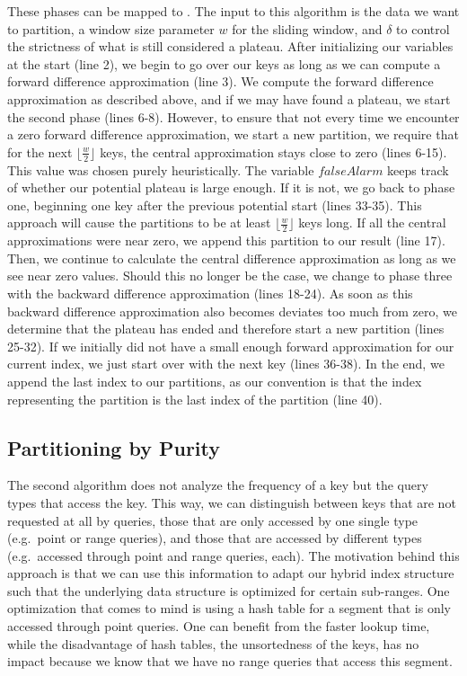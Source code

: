 These phases can be mapped to . The input to this algorithm is the data we want to partition, a window size parameter $w$ for the sliding window, and $\delta$ to control the strictness of what is still considered a plateau. After initializing our variables at the start (line 2), we begin to go over our keys as long as we can compute a forward difference approximation (line 3). We compute the forward difference approximation as described above, and if we may have found a plateau, we start the second phase (lines 6-8). However, to ensure that not every time we encounter a zero forward difference approximation, we start a new partition, we require that for the next $\lfloor \frac{w}{2} \rfloor$ keys, the central approximation stays close to zero (lines 6-15). This value was chosen purely heuristically. The variable $falseAlarm$ keeps track of whether our potential plateau is large enough. If it is not, we go back to phase one, beginning one key after the previous potential start (lines 33-35). This approach will cause the partitions to be at least $\lfloor \frac{w}{2} \rfloor$ keys long. If all the central approximations were near zero, we append this partition to our result (line 17). Then, we continue to calculate the central difference approximation as long as we see near zero values. Should this no longer be the case, we change to phase three with the backward difference approximation (lines 18-24). As soon as this backward difference approximation also becomes deviates too much from zero, we determine that the plateau has ended and therefore start a new partition (lines 25-32). If we initially did not have a small enough forward approximation for our current index, we just start over with the next key (lines 36-38). In the end, we append the last index to our partitions, as our convention is that the index representing the partition is the last index of the partition (line 40).

\subsection{Partitioning by Purity} \label{sec:purity}
The second algorithm does not analyze the frequency of a key but the query types that access the key. This way, we can distinguish between keys that are not requested at all by queries, those that are only accessed by one single type (e.g.~point or range queries), and those that are accessed by different types (e.g.~accessed through point and range queries, each). The motivation behind this approach is that we can use this information to adapt our hybrid index structure such that the underlying data structure is optimized for certain sub-ranges. One optimization that comes to mind is using a hash table for a segment that is only accessed through point queries. One can benefit from the faster lookup time, while the disadvantage of hash tables, the unsortedness of the keys, has no impact because we know that we have no range queries that access this segment.

